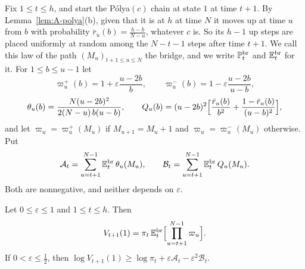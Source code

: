 Fix $1\le t\le h$, and start the P\'olya$(c)$ chain at state $1$ at time $t+1$.
By Lemma~\ref{lem:A-polya}(b), given that it is at $h$ at time $N$ it moves
up at time $u$ from $b$ with probability $\bar r_u(b)=\frac{h-b}{N-u}$,
whatever $c$ is. So its $h-1$ up steps are placed uniformly at random among
the $N-t-1$ steps after time $t+1$. We call this law of the path
$(M_u)_{t+1\le u\le N}$ the bridge, and we write $\mathbb{P}^{\mathrm{br}}_t$ and
$\mathbb{E}^{\mathrm{br}}_t$ for it. For $1\le b\le u-1$ let
\[
 \varpi^+_u(b)=1+\varepsilon\frac{u-2b}{b},\qquad
 \varpi^-_u(b)=1-\varepsilon\frac{u-2b}{u-b},
\]
\[
 \theta_u(b)=\frac{N(u-2b)^2}{2(N-u)\,b(u-b)},\qquad
 Q_u(b)=(u-2b)^2\Bigl[\frac{\bar r_u(b)}{b^2}+\frac{1-\bar r_u(b)}{(u-b)^2}\Bigr],
\]
and let $\varpi_u=\varpi^+_u(M_u)$ if $M_{u+1}=M_u+1$ and
$\varpi_u=\varpi^-_u(M_u)$ otherwise. Put
\[
 \mathcal A_t=\sum_{u=t+1}^{N-1}\mathbb{E}^{\mathrm{br}}_t\,\theta_u(M_u),\qquad
 \mathcal B_t=\sum_{u=t+1}^{N-1}\mathbb{E}^{\mathrm{br}}_t\,Q_u(M_u).
\]
Both are nonnegative, and neither depends on $\varepsilon$.

\begin{proposition}\label{prop:A-bridge}
Let $0\le\varepsilon\le1$ and $1\le t\le h$. Then
\[
 V_{t+1}(1)=\pi_t\,\mathbb{E}^{\mathrm{br}}_t\Bigl[\prod_{u=t+1}^{N-1}\varpi_u\Bigr].
\]
If $0<\varepsilon\le\frac12$, then
$\log V_{t+1}(1)\ge\log\pi_t+\varepsilon \mathcal A_t-\varepsilon^2\mathcal B_t$.
\end{proposition}

